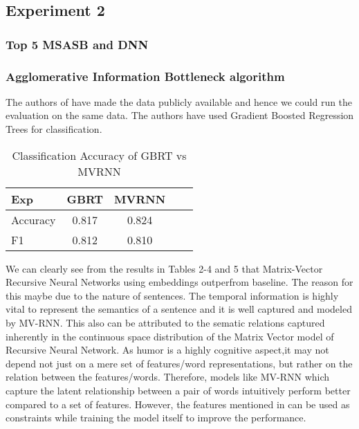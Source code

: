 \documentclass{acm_proc_article-sp}
\begin{document}
\subsection{Experiment 2}
\subsubsection{Top 5 MSASB and DNN}
\subsubsection{Agglomerative Information Bottleneck algorithm}

The authors of \cite{zhang2014recognizing} have made the data publicly available and hence we could run the evaluation on the same data. The authors have used Gradient Boosted Regression Trees for classification. 



\begin{table}[th]
\caption{\label{}Classification Accuracy of GBRT vs MVRNN  }

\vspace{8pt} %

\centering
\begin{tabular}{|l |c |c| c| c|}
\hline%
Exp &  GBRT &  MVRNN  \\
                 
\hline

Accuracy & 0.817 & 0.824 \\
\hline
F1 & 0.812 & 0.810 \\
\hline




\end{tabular}
\end{table}


We can clearly see from the results in Tables 2-4 and 5 that Matrix-Vector Recursive Neural Networks using embeddings outperfrom baseline. The reason for this maybe due to the nature of sentences. The temporal information is highly vital to represent the semantics of a sentence and it is well captured and modeled by MV-RNN. This also can be attributed to the sematic relations captured inherently in the continuous space distribution of the Matrix Vector model of Recursive Neural Network. As humor is a highly cognitive aspect,it may not depend not just on a mere set of features/word representations, but rather on the relation between the features/words. Therefore, models like MV-RNN which capture the latent relationship between a pair of words intuitively perform better compared to a set of features. However, the features mentioned in \cite{zhang2014recognizing} can be used as constraints while training the model itself to improve the performance. 
\end{document}
